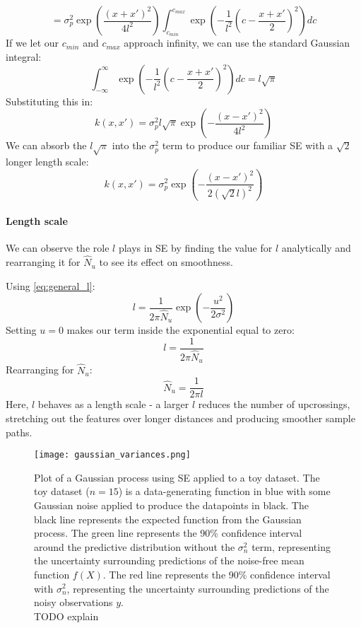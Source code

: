 \begin{equation*}
    = \sigma_p^2 \exp \left( \frac{(x + x')^2}{4l^2} \right) \int_{c_{min}}^{c_{max}} \exp \left( -\frac{1}{l^2} (c - \frac{x + x'}{2})^2 \right) dc
\end{equation*}
If we let our $c_{min}$ and $c_{max}$ approach infinity, we can use the standard Gaussian integral:
\begin{equation*}
    \int_{-\infty}^{\infty} \exp \left( -\frac{1}{l^2} (c - \frac{x + x'}{2})^2 \right) dc = l\sqrt{\pi}
\end{equation*}
Substituting this in:
\begin{equation*}
    k(x, x') = \sigma_p^2 l\sqrt{\pi} \exp \left( -\frac{(x - x')^2}{4l^2} \right)
\end{equation*}
We can absorb the $l\sqrt{\pi}$ into the $\sigma_p^2$ term to produce our familiar SE with a $\sqrt{2}$ longer length scale:
\begin{equation*}
    k(x, x') = \sigma^2_p \exp \left( -\frac{(x - x')^2}{2(\sqrt{2}l)^2} \right)
\end{equation*}

\paragraph{Length scale}
We can observe the role $l$ plays in SE by finding the value for $l$ analytically and rearranging it for $\hat{N}_u$ to see its effect on smoothness.

Using \ref{eq:general_l}:
\begin{equation*}
    l = \frac{1}{2\pi\hat{N}_u} \exp\left(-\frac{u^2}{2\sigma^2}\right)
\end{equation*}
Setting $u = 0$ makes our term inside the exponential equal to zero:
\begin{equation*}
    l = \frac{1}{2\pi\hat{N}_u}
\end{equation*}
Rearranging for $\hat{N}_u$:
\begin{equation*}
    \hat{N}_u = \frac{1}{2\pi l}
\end{equation*}
Here, $l$ behaves as a length scale - a larger $l$ reduces the number of upcrossings, stretching out the features over longer distances and producing smoother sample paths.


\begin{figure}[H]
    \texttt{[image: gaussian\_variances.png]}
    \caption{
        Plot of a Gaussian process using SE applied to a toy dataset. The toy dataset ($n = 15$) is a data-generating function in blue with some Gaussian noise applied to produce the datapoints in black. The black line represents the expected function from the Gaussian process. The green line represents the 90\% confidence interval around the predictive distribution without the $\sigma^2_n$ term, representing the uncertainty surrounding predictions of the noise-free mean function $f(X)$. The red line represents the 90\% confidence interval with $\sigma^2_n$, representing the uncertainty surrounding predictions of the noisy observations $y$. \\
        TODO explain
    }
\end{figure}

